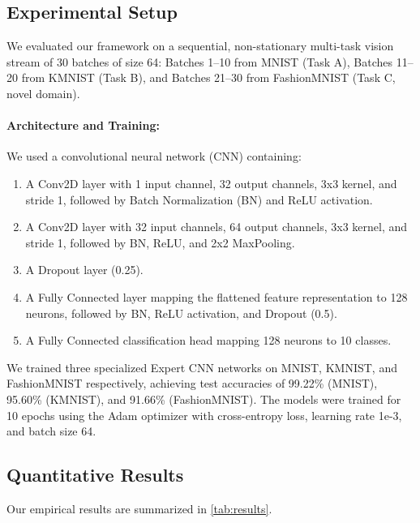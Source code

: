\documentclass{article}
\theoremstyle{plain}
\theoremstyle{definition}
\theoremstyle{remark}
\begin{document}
\subsection{Experimental Setup}
We evaluated our framework on a sequential, non-stationary multi-task vision stream of 30 batches of size 64: Batches 1--10 from MNIST (Task A), Batches 11--20 from KMNIST (Task B), and Batches 21--30 from FashionMNIST (Task C, novel domain). 

\paragraph{Architecture and Training:}
We used a convolutional neural network (CNN) containing:
\begin{enumerate}
    \item A Conv2D layer with 1 input channel, 32 output channels, 3x3 kernel, and stride 1, followed by Batch Normalization (BN) and ReLU activation.
    \item A Conv2D layer with 32 input channels, 64 output channels, 3x3 kernel, and stride 1, followed by BN, ReLU, and 2x2 MaxPooling.
    \item A Dropout layer (0.25).
    \item A Fully Connected layer mapping the flattened feature representation to 128 neurons, followed by BN, ReLU activation, and Dropout (0.5).
    \item A Fully Connected classification head mapping 128 neurons to 10 classes.
\end{enumerate}
We trained three specialized Expert CNN networks on MNIST, KMNIST, and FashionMNIST respectively, achieving test accuracies of 99.22\% (MNIST), 95.60\% (KMNIST), and 91.66\% (FashionMNIST). The models were trained for 10 epochs using the Adam optimizer with cross-entropy loss, learning rate 1e-3, and batch size 64.

\subsection{Quantitative Results}
Our empirical results are summarized in \cref{tab:results}.
\end{document}
